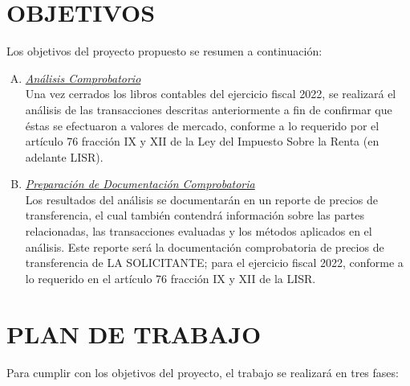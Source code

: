 \documentclass[5pt,letter]{report}
\begin{document}
\section{OBJETIVOS}

Los objetivos del proyecto propuesto se resumen a continuación: 

\begin{enumerate}[A)]

\item \textit{\underline{Análisis Comprobatorio}}\\ 

Una vez cerrados los libros contables del ejercicio fiscal 2022, se realizará el análisis de las transacciones descritas anteriormente a fin de confirmar que éstas se efectuaron a valores de mercado, conforme a lo requerido por el artículo 76 fracción IX y XII de la Ley del Impuesto Sobre la Renta (en adelante LISR). 

\item \textit{\underline{Preparación de Documentación Comprobatoria}} \\

Los resultados del análisis se documentarán en un reporte de precios de transferencia, el cual también contendrá información sobre las partes relacionadas, las transacciones evaluadas y los métodos aplicados en el análisis. Este reporte será la documentación comprobatoria de precios de transferencia de LA SOLICITANTE; para el ejercicio fiscal 2022, conforme a lo requerido en el artículo 76 fracción IX y XII de la LISR. 

\end{enumerate}

\section{PLAN DE TRABAJO}

Para cumplir con los objetivos del proyecto, el trabajo se realizará en tres fases:
\end{document}
